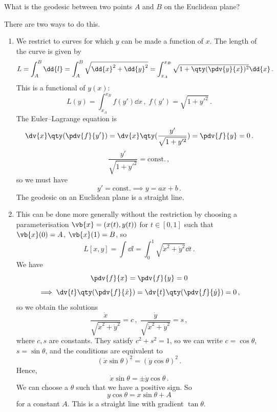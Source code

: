 \documentclass{article}
\theoremstyle{plain}\theoremheaderfont{\normalfont\itshape}\theorembodyfont{\rmfamily}\theoremseparator{.}\newtheorem*{rem}{Remark}\newtheorem*{ex}{Example}\newtheorem*{proof}{Proof}\newtheorem*{altp}{Alternative proof}
\theoremstyle{plain}\theoremheaderfont{\normalfont\bfseries}\theorembodyfont{\rmfamily}\theoremseparator{.}\newtheorem{thm}{Theorem}[section]\newtheorem{lem}[thm]{Lemma}\newtheorem{prop}[thm]{Proposition}\newtheorem*{cor}{Corollary}\newtheorem{defn}[thm]{Definition}\newtheorem{clm}[thm]{Claim}\newtheorem{clminproof}{Claim}
\theoremstyle{break}\theoremheaderfont{\normalfont\itshape}\theorembodyfont{\rmfamily}\theoremseparator{.\medskip}\newtheorem*{proofskip}{Proof}\newtheorem*{exs}{Examples}\newtheorem*{rems}{Remarks}
\theoremstyle{break}\theoremheaderfont{\normalfont\bfseries}\theorembodyfont{\rmfamily}\theoremseparator{.\medskip}\newtheorem{lemskip}[thm]{Lemma}\newtheorem{defnskip}[thm]{Definition}\newtheorem{propskip}[thm]{Proposition}\newtheorem{thmskip}[thm]{Theorem}
\numberwithin{equation}{section}
\begin{document}
	What is the geodesic between two points \(A\) and \(B\) on the Euclidean plane?

	There are two ways to do this.
	\begin{enumerate}[topsep=0pt]
		\item We restrict to curves for which \(y\) can be made a function of \(x\). The length of the curve is given by
		\[L=\int_{A}^{B}\dd{l}=\int_{A}^{B}\sqrt{\dd{x}^2+\dd{y}^2}=\int_{x_A}^{x_B}\sqrt{1+\qty(\pdv{y}{x})^2}\dd{x}\,.\]
		This is a functional of \(y(x)\):
		\[L(y)=\int_{x_A}^{x_B}f(y')\dd{x}\,,\;f(y')=\sqrt{1+y'^2}\,.\]
		The Euler--Lagrange equation is
		\[\dv{x}\qty(\pdv{f}{y'})=\dv{x}\qty(\frac{y'}{\sqrt{1+y'^2}})=\pdv{f}{y}=0\,.\]
		\[\frac{y'}{\sqrt{1+y'^2}}=\text{const.}\,,\]
		so we must have
		\[y'=\text{const.}\implies y=ax+b\,.\]
		The geodesic on an Euclidean plane is a straight line.
		\item This can be done more generally without the restriction by choosing a parameterisation \(\vb{x}=(x(t),y(t))\) for \(t\in[0,1]\) such that \(\vb{x}(0)=A\), \(\vb{x}(1)=B\), so
		\[L[x,y]=\int\dd{l}=\int_{0}^{1}\sqrt{\dot{x}^2+\dot{y}^2}\dd{t}\,.\]
		We have
		\[\pdv{f}{x}=\pdv{f}{y}=0\]
		\[\implies\dv{t}\qty(\pdv{f}{\dot{x}})=\dv{t}\qty(\pdv{f}{\dot{y}})=0\,,\]
		so we obtain the solutions
		\[\frac{\dot{x}}{\sqrt{\dot{x}^2+\dot{y}^2}}=c\,,\;\frac{\dot{y}}{\sqrt{\dot{x}^2+\dot{y}^2}}=s\,,\]
		where \(c,s\) are constants. They satisfy \(c^2+s^2=1\), so we can write \(c=\cos\theta\), \(s=\sin\theta\), and the conditions are equivalent to
		\[(\dot{x}\sin\theta)^2=(\dot{y}\cos\theta)^2\,.\]
		Hence,
		\[\dot{x}\sin\theta=\pm\dot{y}\cos\theta\,.\]
		We can choose a \(\theta\) such that we have a positive sign. So
		\[y\cos\theta=x\sin\theta+A\]
		for a constant \(A\). This is a straight line with gradient \(\tan\theta\).
	\end{enumerate}
\end{document}
